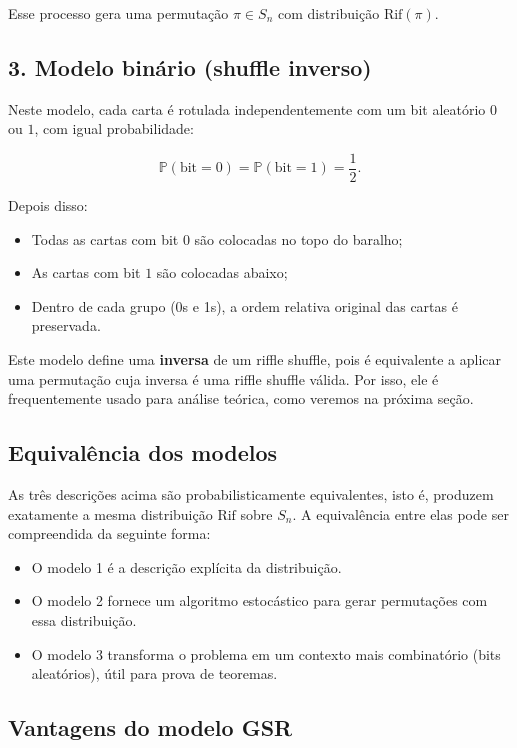 \documentclass[12pt]{article}
\begin{document}
Esse processo gera uma permutação $\pi \in S_n$ com distribuição $\text{Rif}(\pi)$.

\subsection*{3. Modelo binário (shuffle inverso)}

Neste modelo, cada carta é rotulada independentemente com um bit aleatório $0$ ou $1$, com igual probabilidade:

\[
\mathbb{P}(\text{bit} = 0) = \mathbb{P}(\text{bit} = 1) = \dfrac{1}{2}.
\]

Depois disso:
\begin{itemize}
    \item Todas as cartas com bit $0$ são colocadas no topo do baralho;
    \item As cartas com bit $1$ são colocadas abaixo;
    \item Dentro de cada grupo (0s e 1s), a ordem relativa original das cartas é preservada.
\end{itemize}

Este modelo define uma \textbf{inversa} de um riffle shuffle, pois é equivalente a aplicar uma permutação cuja inversa é uma riffle shuffle válida. Por isso, ele é frequentemente usado para análise teórica, como veremos na próxima seção.

\subsection*{Equivalência dos modelos}

As três descrições acima são probabilisticamente equivalentes, isto é, produzem exatamente a mesma distribuição $\text{Rif}$ sobre $S_n$. A equivalência entre elas pode ser compreendida da seguinte forma:

\begin{itemize}
    \item O modelo 1 é a descrição explícita da distribuição.
    \item O modelo 2 fornece um algoritmo estocástico para gerar permutações com essa distribuição.
    \item O modelo 3 transforma o problema em um contexto mais combinatório (bits aleatórios), útil para prova de teoremas.
\end{itemize}

\subsection*{Vantagens do modelo GSR}
\end{document}

